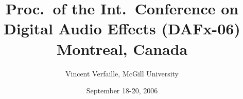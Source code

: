 \usepackage{setspace}
\usepackage{xkeyval}
\usepackage{newapave}
\usepackage[utf8]{inputenc}
\usepackage[T1]{fontenc}
\usepackage{mathptmx}
\usepackage[super]{nth}

\setlength{\LaTeXxShift}{0pt}
\setlength{\LaTeXyShift}{-3mm} %
\setlength{\WordxShift}{10pt}
\setlength{\WordyShift}{-40pt}


\newcommand{\DAFxname}{Proc.~of the \nth{9} %
  Int.~Conference on Digital Audio Effects (DAFx-06)}
\newcommand{\DAFxdate}{September 18-20, 2006}
\newcommand{\DAFxaddress}{Montreal, Canada}

\renewcommand{\procpdfauthor}{Vincent Verfaille, McGill University}
\renewcommand{\procpdftitle}{DAFx-06 Proceedings - \DAFxaddress}
\renewcommand{\procpdfsubject}{Conference proceedings}

\renewcommand{\procchead}{} %
\renewcommand{\proclhead}{{\em \small \DAFxname, \DAFxaddress, \DAFxdate}}
\renewcommand{\proccfoot}{{\small DAFX-\thepage}}
\setlength{\procfootvskip}{1.2mm}
\setlength{\procoptfootvskip}{4mm}

\author{\procpdfauthor}
\title{\DAFxname\\ \DAFxaddress}
\date{\DAFxdate}

